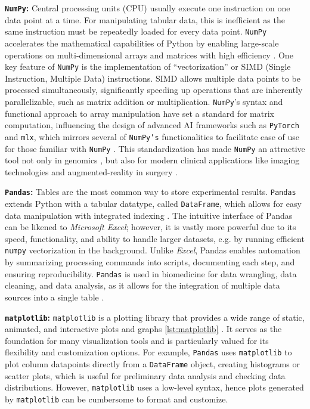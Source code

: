 \textbf{\texttt{NumPy}:} Central processing units (CPU) usually execute one
instruction on one data point at a time. For manipulating tabular data, this is
inefficient as the same instruction must be repeatedly loaded for every data
point. \texttt{NumPy} accelerates the mathematical capabilities of Python by
enabling large-scale operations on multi-dimensional arrays and matrices with
high efficiency \cite{harrisArrayProgrammingNumPy2020}. One key feature of
\texttt{NumPy} is the implementation of ``vectorization'' or SIMD (Single
Instruction, Multiple Data) instructions. SIMD allows multiple data points to be
processed simultaneously, significantly speeding up operations that are
inherently parallelizable, such as matrix addition or multiplication.
\texttt{NumPy}’s syntax and functional approach to array manipulation have set a
standard for matrix computation, influencing the design of advanced AI
frameworks such as \texttt{PyTorch} and \texttt{mlx}, which mirrors several of
\texttt{NumPy’s} functionalities to facilitate ease of use for those familiar
with \texttt{NumPy} \cite{paszkePyTorchImperativeStyle2019,mlx2023}.
This standardization has made \texttt{NumPy} an attractive tool not only in
genomics \cite{dingPyComplexHeatmapPythonPackage2023}, but also for modern
clinical applications like imaging technologies and augmented-reality in
surgery \cite{thompsonSciKitSurgeryCompactLibraries2020}.


\textbf{\texttt{Pandas}:} Tables are the most common way to store experimental
results. \texttt{Pandas} extends Python with a tabular datatype, called
\texttt{DataFrame}, which allows for easy data manipulation with integrated
indexing \cite{mckinneyPandasFoundationalPython2011}. The intuitive interface of
Pandas can be likened to \textit{Microsoft Excel}; however, it is vastly more
powerful due to its speed, functionality, and ability to handle larger datasets,
e.g. by running efficient \texttt{numpy} vectorization in the background. Unlike
\textit{Excel}, Pandas enables automation by summarizing processing commands
into scripts, documenting each step, and ensuring reproducibility.
\texttt{Pandas} is used in biomedicine for data wrangling, data cleaning, and
data analysis, as it allows for the integration of multiple data sources into a
single table \cite{santosCOVID19ScholarlyProduction2020}.

\textbf{\texttt{matplotlib}:} \texttt{matplotlib} is a plotting library that
provides a wide range of static, animated, and interactive plots and graphs
\autoref{lst:matplotlib} \cite{hunterMatplotlib2DGraphics2007}. It serves as the
foundation for many visualization tools and is particularly valued for its
flexibility and customization options. For example, \texttt{Pandas} uses
\texttt{matplotlib} to plot column datapoints directly from a \texttt{DataFrame}
object, creating histograms or scatter plots, which is useful for preliminary
data analysis and checking data distributions. However, \texttt{matplotlib} uses
a low-level syntax, hence plots generated by \texttt{matplotlib} can be
cumbersome to format and customize.


